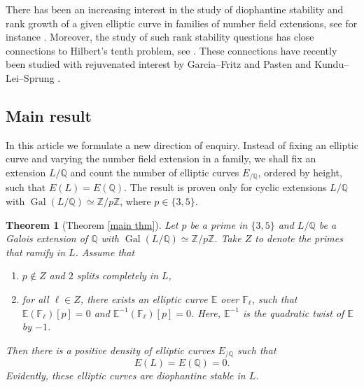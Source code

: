 \documentclass[12pt]{amsart}
\newtheorem{lthm}{Theorem}
\newcommand{\Z}{\mathbb{Z}}
\newcommand{\Q}{\mathbb{Q}}
\newcommand{\F}{\mathbb{F}}
\newcommand{\op}[1]{\operatorname{#1}}
\numberwithin{equation}{section}
\begin{document}
There has been an increasing interest in the study of diophantine stability and rank growth of a given elliptic curve in families of number field extensions, see for instance \cite{MazurRubingrowthofSelmer, Mazurrubingrowthnonabelian, Oliverthorne, ShnidmanWeiss, BKR, Berg}. Moreover, the study of such rank stability questions has close connections to Hilbert's tenth problem, see \cite{MazurRubinH10Inventiones}. These connections have recently been studied with rejuvenated interest by Garcia--Fritz and Pasten \cite{garcia-fritzpasten} and Kundu--Lei--Sprung \cite{KLS}.
\subsection{Main result}
\par In this article we formulate a new direction of enquiry. Instead of fixing an elliptic curve and varying the number field extension in a family, we shall fix an extension $L/\Q$ and count the number of elliptic curves $E_{/\Q}$, ordered by height, such that $E(L)=E(\Q)$. The result is proven only for cyclic extensions $L/\Q$ with $\op{Gal}(L/\Q)\simeq \Z/p\Z$, where $p\in \{3, 5\}$.


\begin{lthm}[Theorem \ref{main thm}]
    Let $p$ be a prime in $\{3, 5\}$ and $L/\Q$ be a Galois extension of $\Q$ with $\op{Gal}(L/\Q)\simeq \Z/p\Z$. Take $Z$ to denote the primes that ramify in $L$. Assume that 
    \begin{enumerate}
        \item $p\notin Z$ and $2$ splits completely in $L$, 
        \item for all $\ell \in Z$, there exists an elliptic curve $\mathbb{E}$ over $\F_\ell$, such that $\mathbb{E}(\F_\ell)[p]=0$ and $\mathbb{E}^{-1}(\F_\ell)[p]=0$. Here, $\mathbb{E}^{-1}$ is the quadratic twist of $\mathbb{E}$ by $-1$. 
    \end{enumerate}
    Then there is a positive density of elliptic curves $E_{/\Q}$ such that
    \[E(L)=E(\Q)=0. \]
    Evidently, these elliptic curves are \emph{diophantine stable} in $L$.
\end{lthm}
\end{document}
